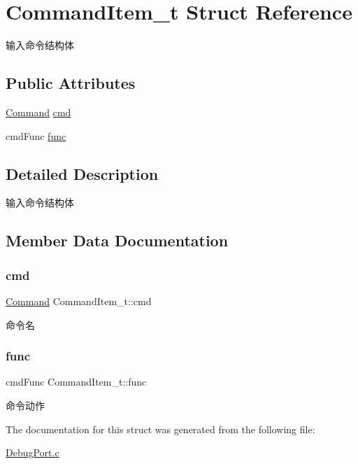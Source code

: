 \hypertarget{struct_command_item__t}{}\section{Command\+Item\+\_\+t Struct Reference}
\label{struct_command_item__t}


输入命令结构体  


\subsection*{Public Attributes}
\begin{DoxyCompactItemize}
\item 
\hyperlink{group___debug_port_ga2afce0a47a93eee73a314d53e4890153}{Command} \hyperlink{struct_command_item__t_ae491a7666177dc3053244448e29c07da}{cmd}
\item 
cmd\+Func \hyperlink{struct_command_item__t_a0b664bef733c27e5bbc6672f5b93bb66}{func}
\end{DoxyCompactItemize}


\subsection{Detailed Description}
输入命令结构体 

\subsection{Member Data Documentation}
\mbox{\label{struct_command_item__t_ae491a7666177dc3053244448e29c07da}} 
\subsubsection{\texorpdfstring{cmd}{cmd}}
{\footnotesize\ttfamily \hyperlink{group___debug_port_ga2afce0a47a93eee73a314d53e4890153}{Command} Command\+Item\+\_\+t\+::cmd}

命令名 \mbox{\label{struct_command_item__t_a0b664bef733c27e5bbc6672f5b93bb66}} 
\subsubsection{\texorpdfstring{func}{func}}
{\footnotesize\ttfamily cmd\+Func Command\+Item\+\_\+t\+::func}

命令动作 

The documentation for this struct was generated from the following file\+:\begin{DoxyCompactItemize}
\item 
\hyperlink{_debug_port_8c}{Debug\+Port.\+c}\end{DoxyCompactItemize}
